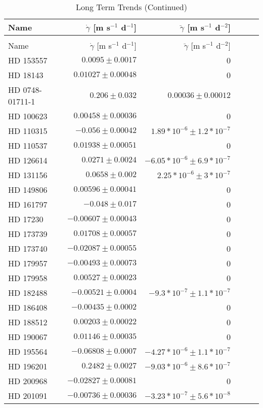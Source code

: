 \begin{longtable*}{lrrrrr}
\caption{Long Term Trends} \\
\toprule 
\midrule 

Name & $\dot \gamma$ [m s$^{-1}$ d$^{-1}$] & $\ddot \gamma$ [m s$^{-1}$ d$^{-2}$] \\ 
\toprule 
\endfirsthead 
\caption[]{Long Term Trends (Continued)} \\
\toprule 
\midrule 
Name & $\dot \gamma$ [m s$^{-1}$ d$^{-1}$] & $\ddot \gamma$ [m s$^{-1}$ d$^{-2}$] \\ 
\toprule 
\endhead 
HD 153557 & $0.0095\pm 0.0017$ & 0 \\ 
HD 18143 & $0.01027\pm 0.00048$ & 0 \\ 
HD 0748-01711-1 & $0.206\pm 0.032$ & $0.00036\pm 0.00012$ \\ 
HD 100623 & $0.00458\pm 0.00036$ & 0 \\ 
HD 110315 & $-0.056\pm 0.00042$ & $1.89*10^{-6}\pm 1.2*10^{-7}$ \\ 
HD 110537 & $0.01938\pm 0.00051$ & 0 \\ 
HD 126614 & $0.0271\pm 0.0024$ & $-6.05*10^{-6}\pm 6.9*10^{-7}$ \\ 
HD 131156 & $0.0658\pm 0.002$ & $2.25*10^{-6}\pm 3*10^{-7}$ \\ 
HD 149806 & $0.00596\pm 0.00041$ & 0 \\ 
HD 161797 & $-0.048\pm 0.017$ & 0 \\ 
HD 17230 & $-0.00607\pm 0.00043$ & 0 \\ 
HD 173739 & $0.01708\pm 0.00057$ & 0 \\ 
HD 173740 & $-0.02087\pm 0.00055$ & 0 \\ 
HD 179957 & $-0.00493\pm 0.00073$ & 0 \\ 
HD 179958 & $0.00527\pm 0.00023$ & 0 \\ 
HD 182488 & $-0.00521\pm 0.0004$ & $-9.3*10^{-7}\pm 1.1*10^{-7}$ \\ 
HD 186408 & $-0.00435\pm 0.0002$ & 0 \\ 
HD 188512 & $0.00203\pm 0.00022$ & 0 \\ 
HD 190067 & $0.01146\pm 0.00035$ & 0 \\ 
HD 195564 & $-0.06808\pm 0.0007$ & $-4.27*10^{-6}\pm 1.1*10^{-7}$ \\ 
HD 196201 & $0.2482\pm 0.0027$ & $-9.03*10^{-6}\pm 8.6*10^{-7}$ \\ 
HD 200968 & $-0.02827\pm 0.00081$ & 0 \\ 
HD 201091 & $-0.00736\pm 0.00036$ & $-3.23*10^{-7}\pm 5.6*10^{-8}$ \\ 

\end{longtable*}
